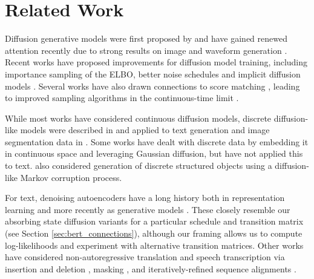 \section{Related Work}

Diffusion generative models were first proposed by \citet{sohl2015deep} and have gained renewed attention recently due to strong results on image and waveform generation \citep{ho2020denoising,wavegrad}. Recent works have proposed improvements for diffusion model training, including importance sampling of the ELBO, better noise schedules \citep{nichol2021improved} and implicit diffusion models \citep{song2021implicit}. Several works have also drawn connections to score matching \citep{vincent2011connection,hyvarinen2004independent,song_2019}, leading to improved sampling algorithms in the continuous-time limit \citep{song2020_sde}.

While most works have considered continuous diffusion models, discrete diffusion-like models were described in \citep{sohl2015deep} and applied to text generation and image segmentation data in \citep{hoogeboom2021argmax}. Some works \citep{permutation,music} have dealt with discrete data by embedding it in continuous space and leveraging Gaussian diffusion, but have not applied this to text. \citet{princeton_chem} also considered generation of discrete structured objects using a diffusion-like Markov corruption process.

For text, denoising autoencoders have a long history both in representation learning \citep{Bengio_2013, bert} and more recently as generative models \citep{bert_speak}. These closely resemble our absorbing state diffusion variants for a particular schedule and transition matrix (see Section \ref{sec:bert_connections}), although our framing allows us to compute log-likelihoods and experiment with alternative transition matrices. Other works have considered non-autoregressive translation and speech transcription via insertion and deletion \citep{levenstein,ruis2020insertion}, masking \citep{mask_predict}, and iteratively-refined sequence alignments \citep{chan2020imputer,saharia2020latentalignments}.